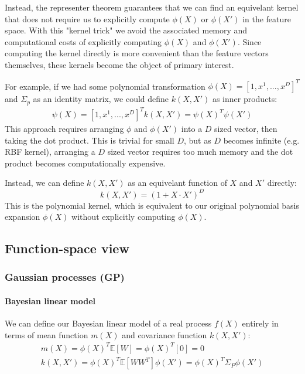 Instead, the representer theorem guarantees that we can find an equivelant kernel that does not require us to explicitly compute $\phi(X)$ or $\phi(X')$ in the feature space. With this "kernel trick" we avoid the associated memory and computational costs of explicitly computing $\phi(X)$ and $\phi(X')$. Since computing the kernel directly is more convenient than the feature vectors themselves, these kernels become the object of primary interest.

For example, if we had some polynomial transformation $\phi(X) = [1, x^1, ..., x^D]^T$ and $\Sigma_p$ as an identity matrix, we could define $k(X,X')$ as inner products:
\begin{equation*}
    \begin{aligned}
        \psi(X) = [1, x^1, ..., x^D]^T
        k(X,X') = \psi(X)^T\psi(X')
    \end{aligned}
\end{equation*}
This approach requires arranging $\phi$ and $\phi(X')$ into a $D$ sized vector, then taking the dot product. This is trivial for small $D$, but as $D$ becomes infinite (e.g. RBF kernel), arranging a $D$ sized vector requires too much memory and the dot product becomes computationally expensive.

Instead, we can define $k(X,X')$ as an equivelant function of $X$ and $X'$ directly:
\begin{equation*}
    k(X,X') = (1 + X \cdot X')^D
\end{equation*}
This is the polynomial kernel, which is equivalent to our original polynomial basis expansion $\phi(X)$ without explicitly computing $\phi(X)$.



\subsection{Function-space view \cite{gp-ml}}

\subsubsection{Gaussian processes (GP)}

\paragraph{Bayesian linear model}
We can define our Bayesian linear model of a real process $f(X)$ entirely in terms of mean function $m(X)$ and covariance function $k(X,X')$:
\begin{equation} \label{eq:gp_bayesian}
    \begin{aligned}
        m(X) = \phi(X)^T\mathbb{E}[W] = \phi(X)^T[0] = 0 \\
        k(X,X') = \phi(X)^T\mathbb{E}[WW^T]\phi(X') = \phi(X)^T\Sigma_P\phi(X')
    \end{aligned}
\end{equation}

